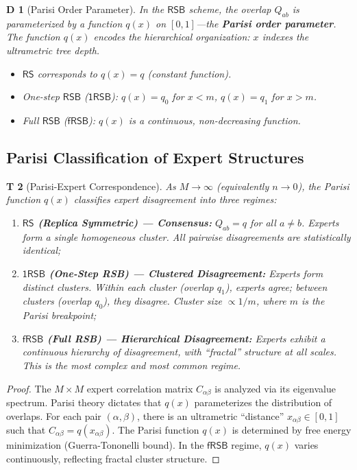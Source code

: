 \documentclass[12pt,a4paper]{article}
\newtheorem{theorem}Theorem[section]
\newtheorem{definition}[theorem]Definition
\newcommand{\RS}{\mathsf{RS}}
\newcommand{\RSB}{\mathsf{RSB}}
\newcommand{\oneRSB}{\mathsf{1RSB}}
\newcommand{\fRSB}{\mathsf{fRSB}}
\begin{document}
\begin{definition}[Parisi Order Parameter]
In the \(\RSB\) scheme, the overlap \(Q_{ab}\) is parameterized by a function \(q(x)\) on \([0,1]\)---the \textbf{Parisi order parameter}. The function \(q(x)\) encodes the hierarchical organization: \(x\) indexes the ultrametric tree depth.
\begin{itemize}
    \item \(\RS\) corresponds to \(q(x) = q\) (constant function).
    \item One-step \(\RSB\) (\(\oneRSB\)): \(q(x) = q_0\) for \(x < m\), \(q(x) = q_1\) for \(x > m\).
    \item Full \(\RSB\) (\(\fRSB\)): \(q(x)\) is a continuous, non-decreasing function.
\end{itemize}
\end{definition}

\subsection{Parisi Classification of Expert Structures}
\begin{theorem}[Parisi-Expert Correspondence]\label{thm:parisi_expert}
As \(M \to \infty\) (equivalently \(n \to 0\)), the Parisi function \(q(x)\) classifies expert disagreement into three regimes:
\begin{enumerate}[label=(\arabic*)]
    \item \textbf{\(\RS\) (Replica Symmetric) --- Consensus:} \(Q_{ab} = q\) for all \(a \neq b\). Experts form a single homogeneous cluster. All pairwise disagreements are statistically identical;
    \item \textbf{\(\oneRSB\) (One-Step RSB) --- Clustered Disagreement:} Experts form distinct clusters. Within each cluster (overlap \(q_1\)), experts agree; between clusters (overlap \(q_0\)), they disagree. Cluster size \(\propto 1/m\), where \(m\) is the Parisi breakpoint;
    \item \textbf{\(\fRSB\) (Full RSB) --- Hierarchical Disagreement:} Experts exhibit a continuous hierarchy of disagreement, with ``fractal'' structure at all scales. This is the most complex and most common regime.
\end{enumerate}
\end{theorem}

\begin{proof}
The \(M \times M\) expert correlation matrix \(C_{\alpha\beta}\) is analyzed via its eigenvalue spectrum. Parisi theory dictates that \(q(x)\) parameterizes the distribution of overlaps. For each pair \((\alpha, \beta)\), there is an ultrametric ``distance'' \(x_{\alpha\beta} \in [0,1]\) such that \(C_{\alpha\beta} = q(x_{\alpha\beta})\). The Parisi function \(q(x)\) is determined by free energy minimization (Guerra-Tononelli bound). In the \(\fRSB\) regime, \(q(x)\) varies continuously, reflecting fractal cluster structure.
\end{proof}
\end{document}

